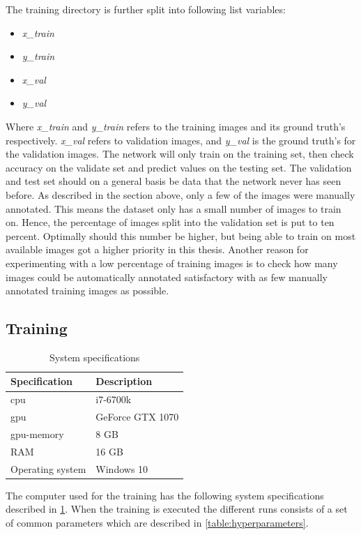 \documentclass[USenglish]{ifimaster}  %
\begin{document}
The training directory is further split into following list variables:
\begin{itemize}
    \item \textit{x\_train}
    \item \textit{y\_train}
    \item \textit{x\_val}
    \item \textit{y\_val}
\end{itemize}
Where \textit{x\_train} and \textit{y\_train} refers to the training images and its ground truth's respectively. \textit{x\_val} refers to validation images, and \textit{y\_val} is the ground truth's for the validation images. The network will only train on the training set, then check accuracy on the validate set and predict values on the testing set. The validation and test set should on a general basis be data that the network never has seen before. As described in the section above, only a few of the images were manually annotated. This means the dataset only has a small number of images to train on. Hence, the percentage of images split into the validation set is put to ten percent. Optimally should this number be higher, but being able to train on most available images got a higher priority in this thesis. Another reason for experimenting with a low percentage of training images is to check how many images could be automatically annotated satisfactory with as few manually annotated training images as possible.

\subsection{Training}

\begin{table}[ht]
\centering
\begin{tabular}{ll}
\hline
\textbf{Specification} & \textbf{Description} \\ \hline
\ac{cpu} & i7-6700k \\
\ac{gpu} & GeForce GTX 1070  \\
\ac{gpu}-memory & 8 GB  \\
RAM & 16 GB \\
Operating system & Windows 10  \\ \hline
\end{tabular}
\caption{System specifications}
\label{table:system_spec}
\end{table}

The computer used for the training has the following system specifications described in \cref{table:system_spec}.
When the training is executed the different runs consists of a set of common parameters which are described in \cref{table:hyperparameters}. 
\end{document}
